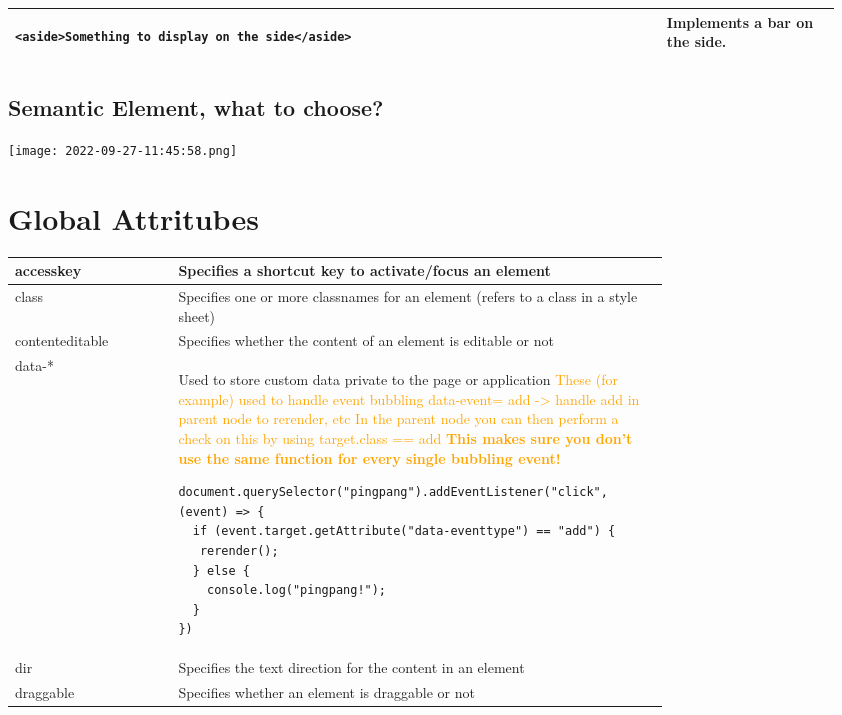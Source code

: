 \documentclass[main.tex,fontsize=8pt,paper=a4,paper=portrait,DIV=calc,]{scrartcl}
\begin{document}
\begin{table}[h!]
\begin{tabular}{|m{0.755\linewidth}|m{0.2\linewidth}|}
\hline
\begin{lstlisting}
<aside>Something to display on the side</aside>
\end{lstlisting}
& Implements a bar on the side.\\

\hline
\end{tabular}
\subsection{Semantic Element, what to choose?}
\texttt{[image: 2022-09-27-11:45:58.png]}
\section{Global Attritubes}
\begin{tabular}{|p{0,2\linewidth}|p{0.755\linewidth}|}
\hline
accesskey & Specifies a shortcut key to activate/focus an element\\
\hline
class & Specifies one or more classnames for an element (refers to a class in a style sheet)\\
\hline
contenteditable & Specifies whether the content of an element is editable or not\\
\hline
data-* & Used to store custom data private to the page or application\newline
\textcolor{orange}{These (for example) used to handle event bubbling\newline 
data-event= add -> handle add in parent node to rerender, etc\newline
In the parent node you can then perform a check on this by using target.class == add\newline
\textbf{This makes sure you don't use the same function for every single bubbling event!}}\newline
\begin{lstlisting}
document.querySelector("pingpang").addEventListener("click", (event) => { 
  if (event.target.getAttribute("data-eventtype") == "add") {
   rerender();
  } else {
    console.log("pingpang!");
  }
})
\end{lstlisting}
\\
\hline
dir & Specifies the text direction for the content in an element\\
\hline
draggable & Specifies whether an element is draggable or not\\

\end{tabular}
\end{table}
\end{document}
